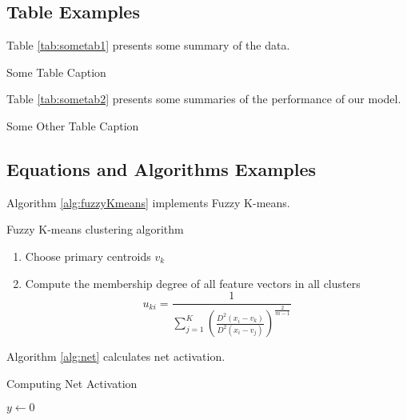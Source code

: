 \documentclass[12pt,letterpaper]{article}
\begin{document}
\subsection{Table Examples}

Table \ref{tab:sometab1} presents some summary of the data.

\begin{table}[htbp]
\caption{Some Table Caption}
\label{tab:sometab1}
\resizebox{0.4\linewidth}{!}{}
\end{table}

Table \ref{tab:sometab2} presents some summaries of the performance of our model.

\begin{table}[htbp]
\caption{Some Other Table Caption}
\label{tab:sometab2}
\resizebox{0.9\linewidth}{!}{}
\end{table}

\subsection{Equations and Algorithms Examples}

Algorithm \ref{alg:fuzzyKmeans} implements Fuzzy K-means.

\begin{algorithm}
\caption{Fuzzy K-means clustering algorithm}
\label{alg:fuzzyKmeans}
\begin{enumerate}
    \item Choose primary centroids $v_{k}$
    \item Compute the membership degree of all feature vectors in all clusters
    \begin{equation}
    u_{ki}  = \frac{1}{ \sum_{j=1}^K ( \frac{D^{2}(x_{i} - v_{k})}{D^{2}(x_{i} - v_{j})})^\frac{2} 
    {m-1}}
    \label{eq:kmeans}
    \end{equation}
\end{enumerate}
\end{algorithm}

Algorithm \ref{alg:net} calculates net activation.


\begin{algorithm}
\caption{Computing Net Activation}
\label{alg:net}
{}
$y\leftarrow 0$\;
\end{algorithm}
\end{document}
